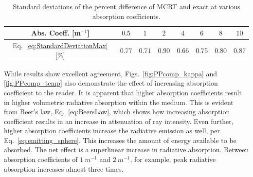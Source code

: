\begin{table}
\centering
\caption{Standard deviations of the percent difference of MCRT and exact at various absorption coefficients.}
\begin{tabular}{c c c c c c c c} 
 \hline
 Abs. Coeff. [m$^{-1}$] & $0.5$ & $1$ & $2$ & $4$ & $6$ & $8$ & $10$\\ [0.5ex] 
 \hline
 Eq.~\ref{eq:StandardDeviationMax} [\%]& $0.77$ & $0.71$ & $0.90$ & $0.66$ & $0.75$ & $0.80$ & $0.87$\\
 \hline
\end{tabular}
\label{table:PPcomp_std}
\end{table}

While results show excellent agreement, Figs.~\ref{fig:PPcomp_kappa} and \ref{fig:PPcomp_temp} also demonstrate the effect of increasing absorption coefficient to the reader. It is apparent that higher absorption coefficients result in higher volumetric radiative absorption within the medium. 
This is evident from Beer's law, Eq.~\ref{eq:BeersLaw}, which shows how increasing absorption coefficient results in an increase in attenuation of ray intensity.
Even further, higher absorption coefficients increase the radiative emission as well, per Eq.~\ref{eq:emitting_sphere}. This increases the amount of energy available to be absorbed. The net effect is a superlinear increase in radiative absorption. Between absorption coefficients of $1~m^{-1}$ and $2~m^{-1}$, for example, peak radiative absorption increases almost three times.

